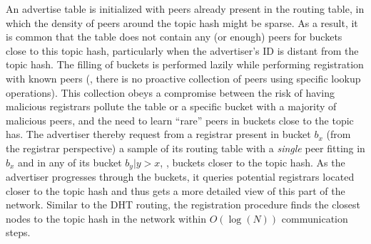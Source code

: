
An advertise table is initialized with peers already present in the routing table, in which the density of peers around the topic hash might be sparse.
As a result, it is common that the table does not contain any (or enough) peers for buckets close to this topic hash, particularly when the advertiser's ID is distant from the topic hash.
The filling of buckets is performed lazily while performing registration with known peers (\ie, there is no proactive collection of peers using specific lookup operations).
This collection obeys a compromise between the risk of having malicious registrars pollute the table or a specific bucket with a majority of malicious peers, and the need to learn ``rare'' peers in buckets close to the topic has.
The advertiser thereby request from a registrar present in bucket $b_x$ (from the registrar perspective) a sample of its routing table with a \emph{single} peer fitting in $b_x$ and in any of its bucket $b_{y}|y>x$, \ie, buckets closer to the topic hash.
As the advertiser progresses through the buckets, it queries potential registrars located closer to the topic hash and thus gets a more detailed view of this part of the network. 
Similar to the DHT routing, the registration procedure finds the closest nodes to the topic hash in the network within $O(\log(N))$ communication steps.

